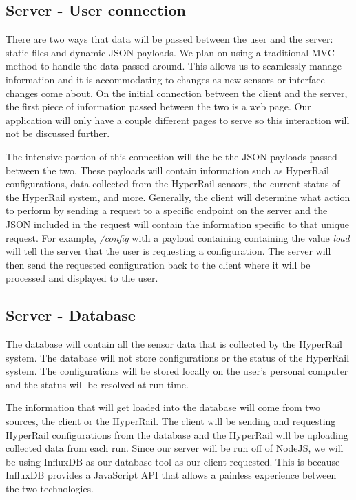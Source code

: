 \documentclass[onecolumn, draftclsnofoot,10pt, compsoc]{IEEEtran}
\begin{document}
    \subsection{Server - User connection}
    
        There are two ways that data will be passed between the user and the server: static files and dynamic JSON payloads. We plan on using a traditional MVC method to handle the data passed around. This allows us to seamlessly manage information and it is accommodating to changes as new sensors or interface changes come about. On the initial connection between the client and the server, the first piece of information passed between the two is a web page. Our application will only have a couple different pages to serve so this interaction will not be discussed further. 
        
        The intensive portion of this connection will the be the JSON payloads passed between the two. These payloads will contain information such as HyperRail configurations, data collected from the HyperRail sensors, the current status of the HyperRail system, and more. Generally, the client will determine what action to perform by sending a request to a specific endpoint on the server and the JSON included in the request will contain the information specific to that unique request. For example, \textit{/config} with a payload containing containing the value \textit{load} will tell the server that the user is requesting a configuration. The server will then send the requested configuration back to the client where it will be processed and displayed to the user.
        
    \subsection{Server - Database}
    
        The database will contain all the sensor data that is collected by the HyperRail system. The database will not store configurations or the status of the HyperRail system. The configurations will be stored locally on the user's personal computer and the status will be resolved at run time. 
        
        The information that will get loaded into the database will come from two sources, the client or the HyperRail. The client will be sending and requesting HyperRail configurations from the database and the HyperRail will be uploading collected data from each run. Since our server will be run off of NodeJS, we will be using InfluxDB as our database tool as our client requested. This is because InfluxDB provides a JavaScript API that allows a painless experience between the two technologies. 
        
\end{document}
